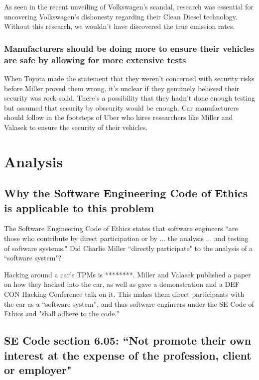 \documentclass[12pt]{article}
\begin{document}
\begin{multicols}{2}
As seen in the recent unveiling of Volkswagen's scandal, research was essential for uncovering Volkswagen's dishonesty regarding their Clean Diesel technology. \cite{vwScandal} Without this research, we wouldn't have discovered the true emission rates.

\subsubsection{Manufacturers should be doing more to ensure their vehicles are safe by allowing for more extensive tests}

When Toyota made the statement that they weren't concerned with security risks \cite{originalHack} before Miller proved them wrong, it's unclear if they genuinely believed their security was rock solid. There's a possibility that they hadn't done enough testing but assumed that security by obscurity would be enough\cite{brokeDMCA}. Car manufacturers should follow in the footsteps of Uber who hires researchers like Miller and Valasek to ensure the security of their vehicles\cite{uber}.


\section{Analysis}

\subsection{Why the Software Engineering Code of Ethics is applicable to this problem}

The Software Engineering Code of Ethics states that software engineers ``are those who contribute by direct participation or by ... the analysis ... and testing of software systems."\cite{seCode} Did Charlie Miller ``directly participate" to the analysis of a ``software system"?

Hacking around a car's TPMs is ********. Miller and Valasek published a paper on how they hacked into the car\cite{officialPaper}, as well as gave a demonstration\cite{wired} and a DEF CON Hacking Conference talk on it\cite{youtube}. This makes them direct participants with the car as a ``software system'', and thus software engineers under the SE Code of Ethics and "shall adhere to the code."\cite{seCode}




\subsection {SE Code section 6.05: ``Not promote their own interest at the expense of the profession, client or employer"\cite{seCode}}


\end{multicols}
\end{document}
